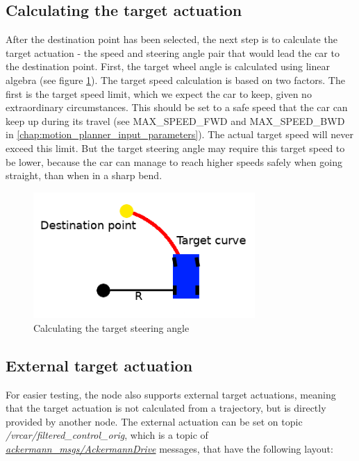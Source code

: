 \subsection{Calculating the target actuation}
After the destination point has been selected, the next step is to calculate the target actuation - the speed and steering angle pair that would lead the car to the destination point. First, the target wheel angle is calculated using linear algebra (see figure \ref{calc_steering_angle}). The target speed calculation is based on two factors. The first is the target speed limit, which we expect the car to keep, given no extraordinary circumstances. This should be set to a safe speed that the car can keep up during its travel (see MAX\_SPEED\_FWD and MAX\_SPEED\_BWD in \ref{chap:motion_planner_input_parameters}). The actual target speed will never exceed this limit. But the target steering angle may require this target speed to be lower, because the car can manage to reach higher speeds safely when going straight, than when in a sharp bend.

\begin{figure}[!ht]
    \centering
    \includegraphics[height=48mm]{figures/raw/calc_steering_angle.png}
    \caption{Calculating the target steering angle}
    \label{calc_steering_angle}
\end{figure}

\subsection{External target actuation}
For easier testing, the node also supports external target actuations, meaning that the target actuation is not calculated from a trajectory, but is directly provided by another node. The external actuation can be set on topic \textit{/vrcar/filtered\_control\_orig}, which is a topic of \href{http://docs.ros.org/jade/api/ackermann_msgs/html/msg/AckermannDrive.html}{\textit{ackermann\_msgs/AckermannDrive}} messages, that have the following layout:

